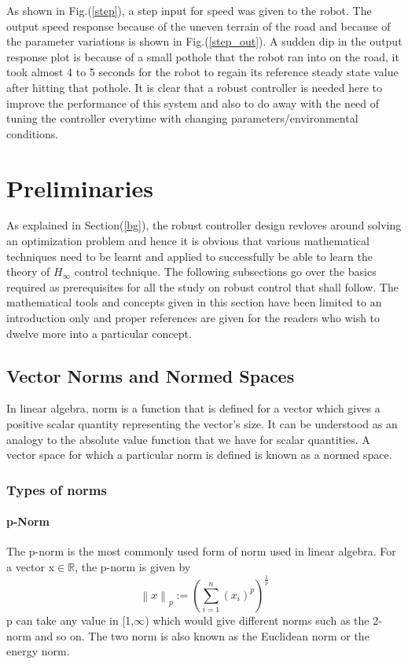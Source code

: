 \documentclass[a4paper,12pt]{article}
\newcommand\norm[1]{\left\lVert#1\right\rVert}
\begin{document}
		As shown in Fig.(\ref{step}), a step input for speed was given to the robot. The output speed response because of the uneven terrain of the road and because of the parameter variations is shown in Fig.(\ref{step_out}). A sudden dip in the output response plot is because of a small pothole that the robot ran into on the road, it took almost 4 to 5 seconds for the robot to regain its reference steady state value after hitting that pothole. It is clear that a robust controller is needed here to improve the performance of this system and also to do away with the need of tuning the controller everytime with changing parameters/environmental conditions.
 
\label{bg}
\section{Preliminaries}

As explained in Section(\ref{bg}), the robust controller design revloves around solving an optimization problem and hence it is obvious that various mathematical techniques need to be learnt and applied to successfully be able to learn the theory of $H_{\infty}$ control technique. The following subsections go over the basics required as prerequisites for all the study on robust control that shall follow. The mathematical tools and concepts given in this section have been limited to an introduction only and proper references are given for the readers who wish to dwelve more into a particular concept. 
	\subsection{Vector Norms and Normed Spaces}
	In linear algebra, norm is a function that is defined for a vector which gives a positive scalar quantity representing the vector's size. It can be understood as an analogy to the absolute value function that we have for scalar quantities. A vector space for which  a particular norm is defined is known as a normed space. 
		\subsubsection{Types of norms}
			\paragraph{p-Norm}  The p-norm is the most commonly used form of norm used in linear algebra. For a vector x$\in \mathbb{R}$, the p-norm is given by
				\begin{equation}
					\norm{x}_{p} := \left(\sum\limits_{i=1}^n  (x_{i})^{p}\right)^{\frac{1}{p}}
				\end{equation}
				p can take any value in [1,$\infty$) which would give different norms such as the 2-norm and so on. The two norm is also known as the Euclidean norm or the energy norm.
				
\end{document}
